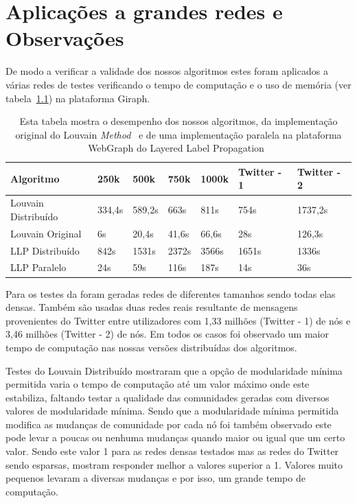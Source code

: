 \chapter{Aplicações a grandes redes e Observações}
De modo a verificar a validade dos nossos algoritmos estes foram aplicados a 
várias redes de testes verificando o tempo de computação e o uso de memória (ver 
tabela~\ref{tbl:tm}) na plataforma Giraph.
\begin{table}
	\centering
 \begin{tabular}{|l|l|l|l|l|l|l|}
 \hline
			Algoritmo & 250k & 500k & 750k & 1000k & Twitter - 1 & Twitter - 2\\ \hline
			Louvain Distribuído&334,4s&589,2s&663s&811s&754s&1737,2s\\ \hline
			Louvain Original&6s&20,4s&41,6s&66,6s&28s&126,3s\\ \hline
			LLP Distribuído& 842s & 1531s & 2372s & 3566s & 1651s &	
1336s
\\ \hline
			LLP Paralelo&24s&59s&116s&187s&14s&36s \\ \hline
		\end{tabular}
		\caption{Esta tabela mostra o desempenho dos nossos algoritmos,
		da implementação original do Louvain 
\textit{Method}~\cite{orgLouvain} e de uma implementação paralela na plataforma 
WebGraph do Layered Label Propagation~\cite{prlLLP}}
		\label{tbl:tm}
\end{table}

  Para os testes da foram geradas redes de diferentes tamanhos sendo todas 
elas densas. Também são usadas duas redes reais resultante de mensagens 
provenientes do Twitter entre utilizadores com 1,33 milhões (Twitter - 1) de nós 
e 3,46 milhões (Twitter - 2) de nós. Em todos os casos foi observado um maior 
tempo de computação nas nossas versões distribuídas dos algoritmos.

Testes do Louvain Distribuído mostraram que a opção de modularidade mínima 
permitida varia o tempo de computação até um valor máximo onde este estabiliza, 
faltando testar a qualidade das comunidades geradas com diversos valores de 
modularidade mínima. 
Sendo que a modularidade mínima permitida modifica as mudanças de comunidade
por cada nó foi também observado este pode levar a poucas ou nenhuma mudanças 
quando maior ou igual que um certo valor. Sendo este valor 1 para as redes 
densas testados mas as redes do Twitter sendo esparsas, mostram responder melhor 
a valores superior a 1. Valores muito pequenos levaram a diversas mudanças e por 
isso, um grande tempo de computação.

